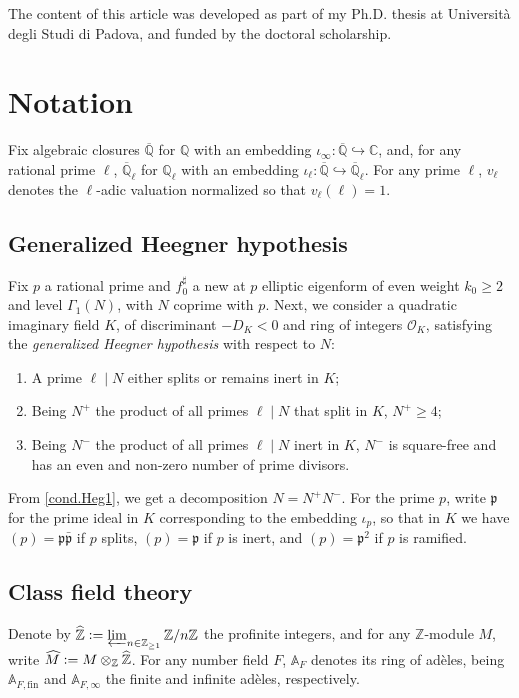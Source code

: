 \documentclass[a4paper]{amsart}
\numberwithin{equation}{section}
\theoremstyle{definition}
\newcommand{\Q}{\mathbb{Q}}
\newcommand{\Z}{\mathbb{Z}}
\newcommand{\C}{\mathbb{C}}
\newcommand{\A}{\mathbb{A}}
\newcommand{\defeq}{\vcentcolon=}
\begin{document}
The content of this article was developed as part of my Ph.D. thesis at Università degli Studi di Padova, and funded by the doctoral scholarship. 

\section{Notation}\label{sec.Notation}

Fix algebraic closures $\overline{\Q}$ for $\Q$ with an embedding $\iota_\infty\colon\overline{\Q}\hookrightarrow\C$, and, for any rational prime $\ell$, $\overline{\Q}_\ell$ for $\Q_\ell$ with an embedding $\iota_\ell\colon\overline{\Q}\hookrightarrow\overline{\Q}_\ell$. For any prime $\ell$, $v_\ell$ denotes the $\ell$-adic valuation normalized so that $v_\ell(\ell)=1$.

\subsection{Generalized Heegner hypothesis}\label{subsec.GeneralizedHeegnerHypothesis}
Fix $p$ a rational prime and $f_0^\sharp$ a new at $p$ elliptic eigenform of even weight $k_0\ge 2$ and level $\Gamma_1(N)$, with $N$ coprime with $p$. Next, we consider a quadratic imaginary field $K$, of discriminant $-D_K<0$ and ring of integers $\mathcal{O}_K$, satisfying the \textit{generalized Heegner hypothesis} with respect to $N$:
\begin{enumerate}[label=\textnormal{(Heg\arabic*)}]
\item\label{cond.Heg1} A prime $\ell\mid N$ either splits or remains inert in $K$;

\item\label{cond.Heg2} Being $N^{+}$ the product of all primes $\ell\mid N$ that split in $K$, $N^{+}\ge 4$;

\item\label{cond.Heg3} Being $N^{-}$ the product of all primes $\ell\mid N$ inert in $K$, $N^{-}$ is square-free and has an even and non-zero number of prime divisors.
\end{enumerate}
From \ref{cond.Heg1}, we get a decomposition $N=N^{+}N^{-}$. For the prime $p$, write $\mathfrak{p}$ for the prime ideal in $K$ corresponding to the embedding $\iota_p$, so that in $K$ we have $(p)=\mathfrak{p}\bar{\mathfrak{p}}$ if $p$ splits, $(p)=\mathfrak{p}$ if $p$ is inert, and $(p)=\mathfrak{p}^2$ if $p$ is ramified.

\subsection{Class field theory}\label{subsec.CFT}
Denote by $\widehat{\Z}\defeq\varprojlim_{n\in\Z_{\ge 1}}\Z/n\Z$ the profinite integers, and for any $\Z$-module $M$, write $\widehat{M}\defeq M\otimes_{\Z}\widehat{\Z}$. For any number field $F$, $\A_F$ denotes its ring of adèles, being $\A_{F,\mathrm{fin}}$ and $\A_{F,\infty}$ the finite and infinite adèles, respectively.
\end{document}
